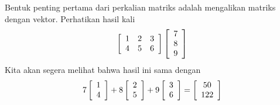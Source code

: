 Bentuk penting pertama dari perkalian matriks adalah mengalikan matriks dengan vektor.
Perhatikan hasil kali
\begin{equation*}
\left[
\begin{array}{rrr}
1 & 2 & 3 \\
4 & 5 & 6
\end{array}
\right] \left[
\begin{array}{r}
7 \\
8 \\
9
\end{array}
\right]
\end{equation*}
Kita akan segera melihat bahwa hasil ini sama dengan
\begin{equation*}
7\left[
\begin{array}{c}
1 \\
4
\end{array}
\right] +8\left[
\begin{array}{c}
2 \\
5
\end{array}
\right] +9\left[
\begin{array}{c}
3 \\
6
\end{array}
\right] =\left[
\begin{array}{c}
50 \\
122
\end{array}
\right]
\end{equation*}

